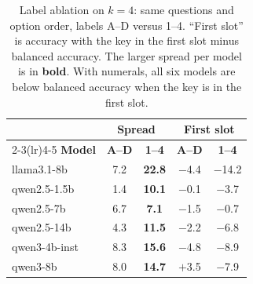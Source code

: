 \begin{table}[t]
    \centering
    \caption{Label ablation on \mmlu $k{=}4$: same questions and option order, labels A--D versus 1--4. ``First slot'' is accuracy with the key in the first slot minus balanced accuracy. The larger spread per model is in \textbf{bold}. With numerals, all six models are below balanced accuracy when the key is in the first slot.}
    \label{tab:labels}
    \small
    \begin{tabular}{@{}lcccc@{}}
        \toprule
        & \multicolumn{2}{c}{\textbf{Spread}} & \multicolumn{2}{c}{\textbf{First slot}} \\
        \cmidrule(lr){2-3}\cmidrule(lr){4-5}
        \textbf{Model} & \textbf{A--D} & \textbf{1--4} & \textbf{A--D} & \textbf{1--4} \\
        \midrule
        llama3.1-8b   & 7.2 & {\bf 22.8} & $-$4.4 & $-$14.2 \\
        qwen2.5-1.5b  & 1.4 & {\bf 10.1} & $-$0.1 & $-$3.7 \\
        qwen2.5-7b    & 6.7 & {\bf 7.1}  & $-$1.5 & $-$0.7 \\
        qwen2.5-14b   & 4.3 & {\bf 11.5} & $-$2.2 & $-$6.8 \\
        qwen3-4b-inst & 8.3 & {\bf 15.6} & $-$4.8 & $-$8.9 \\
        qwen3-8b      & 8.0 & {\bf 14.7} & $+$3.5 & $-$7.9 \\
        \bottomrule
    \end{tabular}
\end{table}
